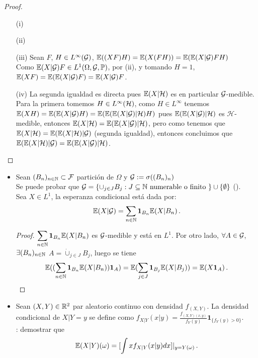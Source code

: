 \begin{proof}
\beforeitemize
\begin{enumerate} \gris
    \item[(i)] \ejercicio \gris
    \item[(ii)] \ejercicio \gris
    \item[(iii)] Sean $F$, $H\in L^\infty(\mathcal{G})$, $\mathbb{E}((X F) H)=\mathbb{E}(X(FH))=\mathbb{E}(\mathbb{E}(X|\mathcal{G})F H)$
    \\ Como $\mathbb{E}(X|\mathcal{G})F \in L^1(\Omega,\mathcal{G},\mathbb{P})$, por (ii), y tomando $H=1$,  $\mathbb{E}(X F)=\mathbb{E}(\mathbb{E}(X|\mathcal{G})F)=\mathbb{E}(X|\mathcal{G})F$.
    \item[(iv)] La segunda igualdad es directa pues $\mathbb{E}(X|\mathcal{H})$ es en particular $\mathcal{G}$-medible. Para la primera tomemos $H\in L^\infty(\mathcal{H})$, como $H\in L^\infty$ tenemos $\mathbb{E}(XH)=\mathbb{E}(\mathbb{E}(X|\mathcal{G})H)=\mathbb{E}(\mathbb{E}(\mathbb{E}(X|\mathcal{G})|\mathcal{H})H)$ pues $\mathbb{E}(\mathbb{E}(X|\mathcal{G})|\mathcal{H})$ es $\mathcal{H}$-medible, entonces $\mathbb{E}(X|\mathcal{H})=\mathbb{E}(\mathbb{E}(X|\mathcal{G})|\mathcal{H})$, pero como tenemos que $\mathbb{E}(X|\mathcal{H})=\mathbb{E}(\mathbb{E}(X|\mathcal{H})|\mathcal{G})$ (segunda igualdad), entonces concluimos que $\mathbb{E}(\mathbb{E}(X|\mathcal{H})|\mathcal{G})=\mathbb{E}(\mathbb{E}(X|\mathcal{G})|\mathcal{H})$.
\end{enumerate}
\findem
\end{proof}
\begin{example}
\beforeitemize
\begin{itemize}
    \item Sean $(B_n)_{n\in\mathbb{N}}\subset\mathcal{F}$ partición de $\Omega$ y $\mathcal{G}:=\sigma((B_n)_n)$
    \\ Se puede probar que $\mathcal{G}=\{\cup_{j\in J}B_j:J\subseteq\mathbb{N}\mbox{ numerable o finito }\}\cup\{\emptyset\}$ (\ejercicio).
    \\ Sea $X\in L^1$, la esperanza condicional está dada por:
    $$ \mathbb{E}(X|\mathcal{G})=\displaystyle\sum_{n\in\mathbb{N}}\mathbf{1}_{B_n}\mathbb{E}(X|B_n) \, .$$
    \begin{proof} \gris
    $\displaystyle\sum_{n\in\mathbb{N}}\mathbf{1}_{B_n}\mathbb{E}(X|B_n)$ es $\mathcal{G}$-medible y está en $L^1$. Por otro lado, $\forall A\in\mathcal{G}$, $\exists (B_n)_{n\in\mathbb{N}}$ $A=\displaystyle \dot\cup_{j\in J}B_j$, luego se tiene
    $$ \mathbb{E}((\displaystyle\sum_{n\in\mathbb{N}}\mathbf{1}_{B_n}\mathbb{E}(X|B_n))\mathbf{1}_A)=\mathbb{E}(\sum_{j\in J}\mathbf{1}_{B_j}\mathbb{E}(X|B_j))=\mathbb{E}(X \mathbf{1}_A) \, .$$
    \negro \end{proof}
    \item Sean $(X,Y)\in\mathbb{R}^2$ par aleatorio continuo con densidad $f_{(X,Y)}$. La densidad condicional de $X|Y=y$ se define como $\displaystyle f_{X|Y}(x|y) = \frac{f_{(X,Y)(x,y)}}{f_Y(y)}\mathbf{1}_{\{f_Y(y)>0\}}$.
    \\ \ejercicio: demostrar que 
    $$ \mathbb{E}(X|Y)(\omega) = [\displaystyle\int x f_{X|Y}(x|y)dx]|_{y=Y(\omega)} \, .$$
\end{itemize}
\end{example}

